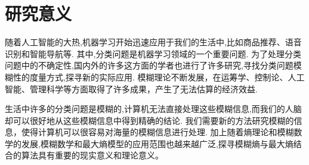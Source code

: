 \section{研究意义}
随着人工智能的大热,机器学习开始迅速应用于我们的生活中,比如商品推荐、语音识别和智能导航等.
其中,分类问题是机器学习领域的一个重要问题.
为了处理分类问题中的不确定性,国内外的许多这方面的学者也进行了许多研究,寻找分类问题模糊性的度量方式,探寻新的实际应用.
模糊理论不断发展，在运筹学、控制论、人工智能、管理科学等方面取得了许多成果，产生了无法估算的经济效益.
\par
生活中许多的分类问题是模糊的,计算机无法直接处理这些模糊信息,而我们的人脑却可以很好地从这些模糊信息中得到精确的结论.
我们需要新的方法研究模糊的信息，使得计算机可以很容易对海量的模糊信息进行处理.
加上随着熵理论和模糊数学的发展,模糊数学和最大熵模型的应用范围也越来越广泛,探寻模糊熵与最大熵结合的算法具有重要的现实意义和理论意义。